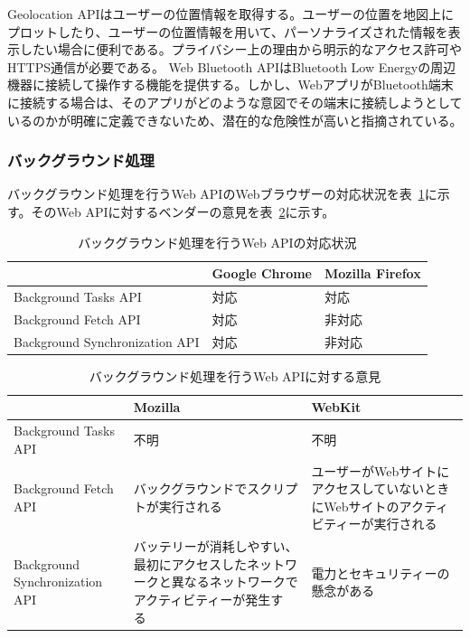 Geolocation APIはユーザーの位置情報を取得する。ユーザーの位置を地図上にプロットしたり、ユーザーの位置情報を用いて、パーソナライズされた情報を表示したい場合に便利である。プライバシー上の理由から明示的なアクセス許可やHTTPS通信が必要である。
Web Bluetooth APIはBluetooth Low Energyの周辺機器に接続して操作する機能を提供する。しかし、WebアプリがBluetooth端末に接続する場合は、そのアプリがどのような意図でその端末に接続しようとしているのかが明確に定義できないため、潜在的な危険性が高いと指摘されている。
\subsubsection{バックグラウンド処理}\label{subsubsection:バックグラウンド処理}
バックグラウンド処理を行うWeb APIのWebブラウザーの対応状況を表~\ref{table:バックグラウンド処理を行うWeb APIの対応状況}に示す。そのWeb APIに対するベンダーの意見を表~\ref{table:バックグラウンド処理を行うWeb APIに対する意見}に示す。
\begin{table}
  \caption{バックグラウンド処理を行うWeb APIの対応状況}\label{table:バックグラウンド処理を行うWeb APIの対応状況}
  \centering
  \begin{tabular}{|p{13em}|p{8em}|p{8em}|}
    \hline
    & Google Chrome & Mozilla Firefox \\ \hline
    Background Tasks API & \cellcolor{green!25}対応 & \cellcolor{green!25}対応 \\ \hline
    Background Fetch API & \cellcolor{green!25}対応 & \cellcolor{red!25}非対応 \\ \hline
    Background Synchronization API & \cellcolor{green!25}対応 & \cellcolor{red!25}非対応 \\ \hline
  \end{tabular}
\end{table}
\begin{table}
  \caption{バックグラウンド処理を行うWeb APIに対する意見}
  \label{table:バックグラウンド処理を行うWeb APIに対する意見}
    \centering
    \begin{tabular}{|p{13em}|p{13em}|p{13em}|}
        \hline
        & Mozilla & WebKit \\ \hline
        Background Tasks API & 不明 & 不明 \\ \hline
        Background Fetch API & \cellcolor{red!25}バックグラウンドでスクリプトが実行される~\cite{MozillaBackgroundFetchAPI} & \cellcolor{red!25}ユーザーがWebサイトにアクセスしていないときにWebサイトのアクティビティーが実行される~\cite{WebKitBackgroundFetchAPI} \\ \hline
        Background Synchronization API & \cellcolor{red!25}バッテリーが消耗しやすい、最初にアクセスしたネットワークと異なるネットワークでアクティビティーが発生する~\cite{MozillaBackgroundSynchronizationAPI} & \cellcolor{red!25}電力とセキュリティーの懸念がある \\ \hline
    \end{tabular}
\end{table}
